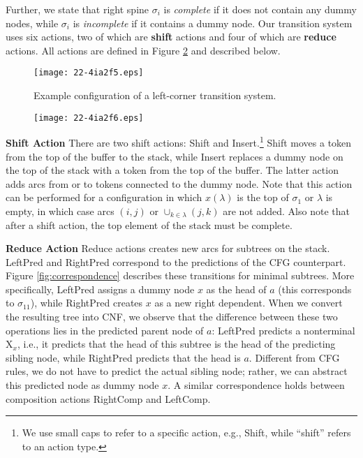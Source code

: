 \documentclass[english]{jnlp_1.4}
\begin{document}
Further, we state that right spine $\sigma_i$ is {\it complete} if it does not contain any dummy nodes, while $\sigma_i$ is {\it incomplete} if it contains a dummy node.
Our transition system uses six actions, two of which are {\bf shift} actions and four of which are {\bf reduce} actions.
All actions are defined in Figure \ref{fig:actions} and described below.

\begin{figure}[b]
\begin{center}
\texttt{[image: 22-4ia2f5.eps]}
\end{center}
\caption{Example configuration of a left-corner transition system.}
\label{fig:config}
\end{figure}
\begin{figure}[b]
\begin{center}
\texttt{[image: 22-4ia2f6.eps]}
\end{center}
\label{fig:actions}
\end{figure}



    \noindent\textbf{Shift Action}
There are two shift actions: {\sc Shift} and {\sc Insert}.\footnote{We use small caps to refer to a specific action, e.g., {\sc Shift}, while ``shift'' refers to an action type.}
{\sc Shift} moves a token from the top of the buffer to the stack, while {\sc Insert} replaces a dummy node on the top of the stack with a token from the top of the buffer.
The latter action adds arcs from or to tokens connected to the dummy node.
Note that this action can be performed for a configuration in which $x(\lambda)$ is the top of $\sigma_1$ or $\lambda$ is empty, in which case arcs $(i, j)$ or $\cup_{k\in\lambda} (j,k)$ are not added.
Also note that after a shift action, the top element of the stack must be complete.

    \noindent\textbf{Reduce Action}
Reduce actions creates new arcs for subtrees on the stack.
{\sc LeftPred} and {\sc RightPred} correspond to the predictions of the CFG counterpart.
Figure \ref{fig:correspondence} describes these transitions for minimal subtrees.
More specifically, {\sc LeftPred} assigns a dummy node $x$ as the head of $a$ (this corresponds to $\sigma_{11}$), while {\sc RightPred} creates $x$ as a new right dependent.
When we convert the resulting tree into CNF, we observe that the difference between these two operations lies in the predicted parent node of $a$:
{\sc LeftPred} predicts a nonterminal X$_x$, i.e., it predicts that the head of this subtree is the head of the predicting sibling node, while {\sc RightPred} predicts that the head is $a$.
Different from CFG rules, we do not have to predict the actual sibling node;
rather, we can abstract this predicted node as dummy node $x$.
A similar correspondence holds between composition actions {\sc RightComp} and {\sc LeftComp}.
\end{document}
